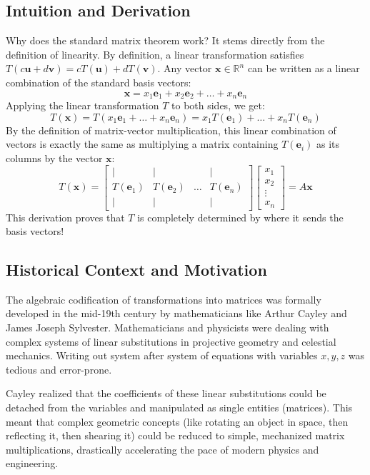 \documentclass[11pt]{article}
\begin{document}
\subsection{Intuition and Derivation}
Why does the standard matrix theorem work? It stems directly from the definition of linearity. By definition, a linear transformation satisfies $T(c\mathbf{u} + d\mathbf{v}) = cT(\mathbf{u}) + dT(\mathbf{v})$. 
Any vector $\mathbf{x} \in \mathbb{R}^n$ can be written as a linear combination of the standard basis vectors:
\[ \mathbf{x} = x_1\mathbf{e}_1 + x_2\mathbf{e}_2 + \dots + x_n\mathbf{e}_n \]
Applying the linear transformation $T$ to both sides, we get:
\[ T(\mathbf{x}) = T(x_1\mathbf{e}_1 + \dots + x_n\mathbf{e}_n) = x_1T(\mathbf{e}_1) + \dots + x_nT(\mathbf{e}_n) \]
By the definition of matrix-vector multiplication, this linear combination of vectors is exactly the same as multiplying a matrix containing $T(\mathbf{e}_i)$ as its columns by the vector $\mathbf{x}$:
\[ T(\mathbf{x}) = \begin{bmatrix} | & | & & | \\ T(\mathbf{e}_1) & T(\mathbf{e}_2) & \dots & T(\mathbf{e}_n) \\ | & | & & | \end{bmatrix} \begin{bmatrix} x_1 \\ x_2 \\ \vdots \\ x_n \end{bmatrix} = A\mathbf{x} \]
This derivation proves that $T$ is completely determined by where it sends the basis vectors!

\subsection{Historical Context and Motivation}
The algebraic codification of transformations into matrices was formally developed in the mid-19th century by mathematicians like Arthur Cayley and James Joseph Sylvester. Mathematicians and physicists were dealing with complex systems of linear substitutions in projective geometry and celestial mechanics. Writing out system after system of equations with variables $x, y, z$ was tedious and error-prone. 

Cayley realized that the coefficients of these linear substitutions could be detached from the variables and manipulated as single entities (matrices). This meant that complex geometric concepts (like rotating an object in space, then reflecting it, then shearing it) could be reduced to simple, mechanized matrix multiplications, drastically accelerating the pace of modern physics and engineering.
\end{document}
